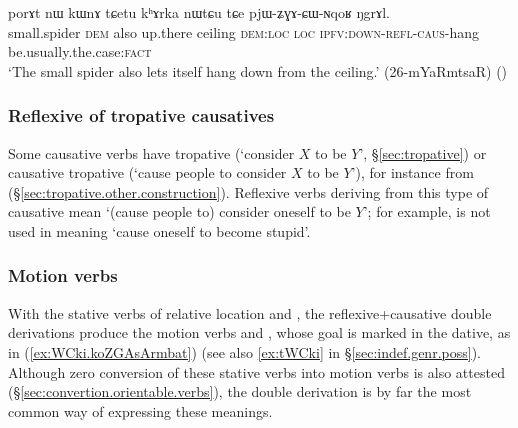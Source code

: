 \begin{exe}
\ex \label{ex:pjWZGACWNqoR}
\gll  porɤt nɯ kɯnɤ tɕetu kʰɤrka nɯtɕu tɕe pjɯ-ʑɣɤ-ɕɯ-ɴqoʁ ŋgrɤl. \\
small.spider \textsc{dem} also up.there ceiling \textsc{dem}:\textsc{loc} \textsc{loc} \textsc{ipfv}:\textsc{down}-\textsc{refl}-\textsc{caus}-hang be.usually.the.case:\textsc{fact} \\
\glt `The small spider also lets itself hang down from the ceiling.' (26-mYaRmtsaR) ()
 \end{exe}
 
 

% 
 
 
 
\subsubsection{Reflexive of tropative causatives} \label{sec:refl.trop.caus}
Some causative verbs have tropative (`consider $X$ to be $Y$', §\ref{sec:tropative}) or causative tropative (`cause people to consider $X$ to be $Y$'), for instance  from  (§\ref{sec:tropative.other.construction}). Reflexive verbs deriving from this type of causative mean `(cause people to) consider oneself to be $Y$'; for example,  is not used in meaning `cause oneself to become stupid'.
 
 
 \subsubsection{Motion verbs} \label{sec:refl.caus.motion}

With the stative verbs of relative location  and  , the reflexive+causative double derivations produce the motion verbs  and , whose goal is marked in the dative, as in (\ref{ex:WCki.koZGAsArmbat}) (see also \ref{ex:tWCki} in §\ref{sec:indef.genr.poss}). Although zero conversion of these stative verbs into motion verbs is also attested (§\ref {sec:convertion.orientable.verbs}), the double derivation is by far the most common way of expressing these meanings.

